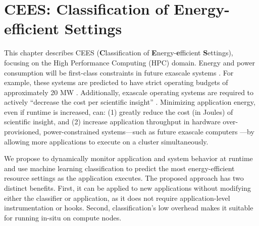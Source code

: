 \chapter{CEES: Classification of Energy-efficient Settings}

This chapter describes CEES (\textbf{C}lassification of \textbf{E}nergy-\textbf{e}fficient \textbf{S}ettings), focusing on the High Performance Computing (HPC) domain.
Energy and power consumption will be first-class constraints in future exascale systems \cite{exaosr-power}.
For example, these systems are predicted to have strict operating budgets of approximately 20 MW \cite{Exascale20MW}.
Additionally, exascale operating systems are required to actively ``decrease the cost per scientific insight'' \cite{DOEML}.  
Minimizing application energy, even if runtime is increased, can: (1) greatly reduce the cost (in Joules) of scientific insight, and (2) increase application throughput in hardware over-provisioned, power-constrained systems---such as future exascale computers \cite{PatkiRMAP,Sarood2013}---by allowing more applications to execute on a cluster simultaneously.

We propose to dynamically monitor application and system behavior at runtime and use machine learning classification to predict the most energy-efficient resource settings as the application executes.
The proposed approach has two distinct benefits.
First, it can be applied to new applications without modifying either the classifier or application, as it does not require application-level instrumentation or hooks.
Second, classification's low overhead makes it suitable for running in-situ on compute nodes.






